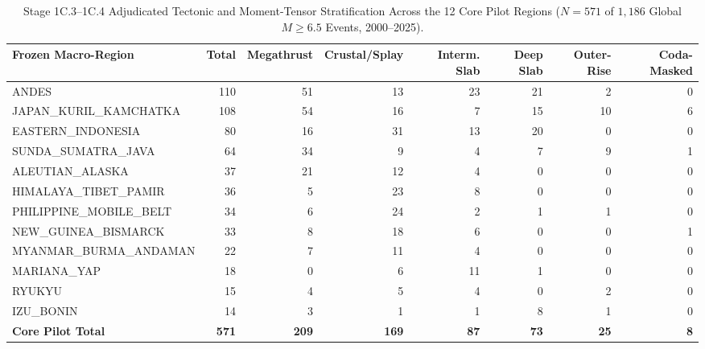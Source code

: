 ﻿%
\begin{table}[t]
\centering
\caption{Stage 1C.3--1C.4 Adjudicated Tectonic and Moment-Tensor Stratification Across the 12 Core Pilot Regions ($N = 571$ of $1{,}186$ Global $M \ge 6.5$ Events, 2000--2025).}
\label{tab:stage1c_summary}
\begin{tabular}{lrrrrrrr}
\hline
\textbf{Frozen Macro-Region} & \textbf{Total} & \textbf{Megathrust} & \textbf{Crustal/Splay} & \textbf{Interm. Slab} & \textbf{Deep Slab} & \textbf{Outer-Rise} & \textbf{Coda-Masked} \\
\hline
ANDES & 110 & 51 & 13 & 23 & 21 & 2 & 0 \\
JAPAN\_KURIL\_KAMCHATKA & 108 & 54 & 16 & 7 & 15 & 10 & 6 \\
EASTERN\_INDONESIA & 80 & 16 & 31 & 13 & 20 & 0 & 0 \\
SUNDA\_SUMATRA\_JAVA & 64 & 34 & 9 & 4 & 7 & 9 & 1 \\
ALEUTIAN\_ALASKA & 37 & 21 & 12 & 4 & 0 & 0 & 0 \\
HIMALAYA\_TIBET\_PAMIR & 36 & 5 & 23 & 8 & 0 & 0 & 0 \\
PHILIPPINE\_MOBILE\_BELT & 34 & 6 & 24 & 2 & 1 & 1 & 0 \\
NEW\_GUINEA\_BISMARCK & 33 & 8 & 18 & 6 & 0 & 0 & 1 \\
MYANMAR\_BURMA\_ANDAMAN & 22 & 7 & 11 & 4 & 0 & 0 & 0 \\
MARIANA\_YAP & 18 & 0 & 6 & 11 & 1 & 0 & 0 \\
RYUKYU & 15 & 4 & 5 & 4 & 0 & 2 & 0 \\
IZU\_BONIN & 14 & 3 & 1 & 1 & 8 & 1 & 0 \\
\hline
\textbf{Core Pilot Total} & \textbf{571} & \textbf{209} & \textbf{169} & \textbf{87} & \textbf{73} & \textbf{25} & \textbf{8} \\
\hline
\end{tabular}
\end{table}


